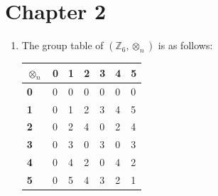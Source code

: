 \section*{Chapter 2}
\begin{enumerate}
    \item The group table of $(\mathbb{Z}_6, \otimes_n)$ is as follows:

    \begin{table}[h]
        \centering
        \begin{tabular}{|l|l|l|l|l|l|l|}
        \hline
        \textbf{$\otimes_n$} & \textbf{0} & \textbf{1} & \textbf{2} & \textbf{3} & \textbf{4} & \textbf{5} \\ \hline
        \textbf{0}       & 0          & 0          & 0          & 0          & 0          & 0          \\ \hline
        \textbf{1}       & 0          & 1          & 2          & 3          & 4          & 5          \\ \hline
        \textbf{2}       & 0          & 2          & 4          & 0          & 2          & 4          \\ \hline
        \textbf{3}       & 0          & 3          & 0          & 3          & 0          & 3          \\ \hline
        \textbf{4}       & 0          & 4          & 2          & 0          & 4          & 2          \\ \hline
        \textbf{5}       & 0          & 5          & 4          & 3          & 2          & 1          \\ \hline
        \end{tabular}
    \end{table}


\end{enumerate}
